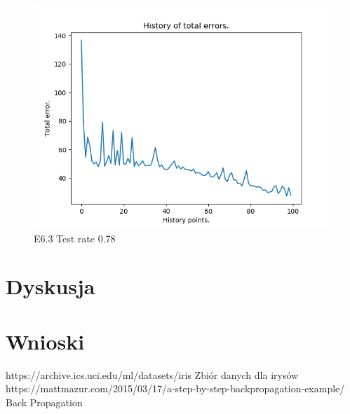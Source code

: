 \documentclass{classrep}
\begin{document}
\begin{figure}[H]
\begin{minipage}{0.5\linewidth}
				\centering
				\includegraphics[scale=0.25]{seeds_nn_m9.png}
				\caption{E6.3 Test rate  0.78}
				\label{E6.3}
			\end{minipage}
		\end{figure}
		\FloatBarrier
			

\section{Dyskusja}

\section{Wnioski}


\begin{thebibliography}{0}
https://archive.ics.uci.edu/ml/datasets/iris
Zbiór danych dla irysów
https://mattmazur.com/2015/03/17/a-step-by-step-backpropagation-example/
Back Propagation
\end{thebibliography}
\end{document}
